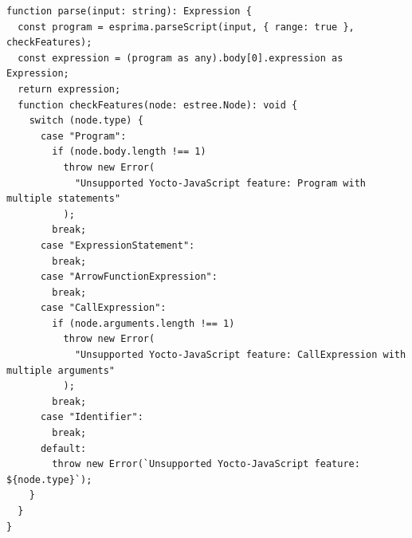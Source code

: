\documentclass[12pt, oneside]{book}
\begin{document}
\begin{verbatim}
function parse(input: string): Expression {
  const program = esprima.parseScript(input, { range: true }, checkFeatures);
  const expression = (program as any).body[0].expression as Expression;
  return expression;
  function checkFeatures(node: estree.Node): void {
    switch (node.type) {
      case "Program":
        if (node.body.length !== 1)
          throw new Error(
            "Unsupported Yocto-JavaScript feature: Program with multiple statements"
          );
        break;
      case "ExpressionStatement":
        break;
      case "ArrowFunctionExpression":
        break;
      case "CallExpression":
        if (node.arguments.length !== 1)
          throw new Error(
            "Unsupported Yocto-JavaScript feature: CallExpression with multiple arguments"
          );
        break;
      case "Identifier":
        break;
      default:
        throw new Error(`Unsupported Yocto-JavaScript feature: ${node.type}`);
    }
  }
}
\end{verbatim}
\end{document}
